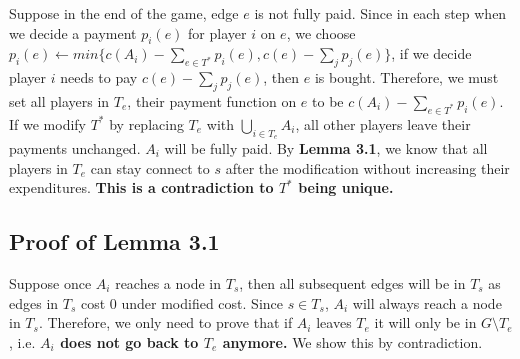 \documentclass[11pt,psfig,times]{article}
\begin{document}
	
	
 Suppose in the end of the game, edge $e$ is not fully paid. Since in each step when we decide a payment $p_i(e)$ for player $i$ on $e$, we choose \(p_i(e) \gets min\{c(A_i) - \sum_{e\in T^*}p_i(e), c(e)-\sum_{j}p_j(e) \}\), if we decide player $i$ needs to pay $c(e)-\sum_{j}p_j(e) $, then $e$ is bought. Therefore, we must set all players in $T_e$, their payment function on $e$ to be $c(A_i) - \sum_{e\in T^*}p_i(e)$. If we modify $T^*$ by replacing $T_e$ with \(\bigcup_{i\in T_e} A_i\), all other players leave their payments unchanged. $A_i$ will be fully paid. By \textbf{Lemma 3.1}, we know that all players in $T_e$ can stay connect to $s$ after the modification without increasing their expenditures. \textbf{This is a contradiction to $T^*$ being unique.}

	
\subsection{Proof of Lemma 3.1}
Suppose once $A_i$ reaches a node in $T_s$, then all subsequent edges will be in $T_s$ as edges in $T_s$ cost 0 under modified cost. Since $s \in T_s$, $A_i$ will always reach a node in $T_s$. Therefore, we only need to prove that if $A_i$ leaves $T_e$ it will only be in $G\setminus T_e$, i.e. \textbf{$A_i$ does not go back to $T_e$ anymore.} We show this by contradiction. 
\end{document}
